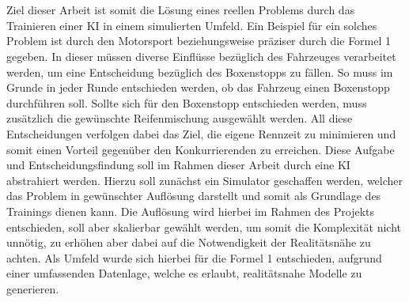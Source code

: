 \\
\\
Ziel dieser Arbeit ist somit die Lösung eines reellen Problems durch das Trainieren einer KI in einem simulierten Umfeld. Ein Beispiel für ein solches Problem ist durch den Motorsport beziehungsweise präziser durch die Formel 1 gegeben. In dieser müssen diverse Einflüsse bezüglich des Fahrzeuges verarbeitet werden, um eine Entscheidung bezüglich des Boxenstopps zu fällen. So muss im Grunde in jeder Runde entschieden werden, ob das Fahrzeug einen Boxenstopp durchführen soll. Sollte sich für den Boxenstopp entschieden werden, muss zusätzlich die gewünschte Reifenmischung ausgewählt werden. All diese Entscheidungen verfolgen dabei das Ziel, die eigene Rennzeit zu minimieren und somit einen Vorteil gegenüber den Konkurrierenden zu erreichen. Diese Aufgabe und Entscheidungsfindung soll im Rahmen dieser Arbeit durch eine KI abstrahiert werden. Hierzu soll zunächst ein Simulator geschaffen werden, welcher das Problem in gewünschter Auflösung darstellt und somit als Grundlage des Trainings dienen kann. Die Auflösung wird hierbei im Rahmen des Projekts entschieden, soll aber skalierbar gewählt werden, um somit die Komplexität nicht unnötig, zu erhöhen aber dabei auf die Notwendigkeit der Realitätsnähe zu achten. Als Umfeld wurde sich hierbei für die Formel 1 entschieden, aufgrund einer umfassenden Datenlage, welche es erlaubt, realitätsnahe Modelle zu generieren.